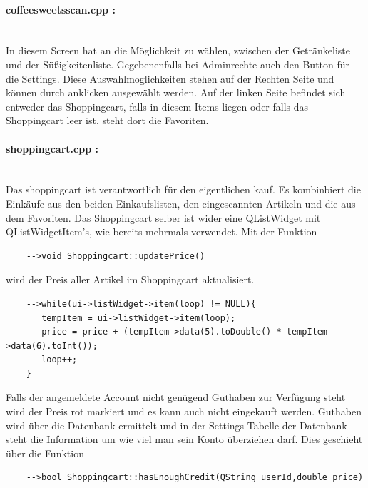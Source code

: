 \documentclass[11pt,a4paper]{article} %
\begin{document}
\paragraph{coffeesweetsscan.cpp :} $\;$ \\
	In diesem Screen hat an die Möglichkeit zu wählen, zwischen der Getränkeliste und der Süßigkeitenliste. Gegebenenfalls bei Adminrechte auch den Button für die Settings.
	Diese Auswahlmoglichkeiten stehen auf der Rechten Seite und können durch anklicken ausgewählt werden. 
	Auf der linken Seite befindet sich entweder das Shoppingcart, falls in diesem Items liegen oder falls das Shoppingcart leer ist, steht dort die Favoriten.
\par	
\paragraph{shoppingcart.cpp :} $\;$ \\
	Das shoppingcart ist verantwortlich für den eigentlichen kauf. Es kombinbiert die Einkäufe aus den beiden Einkaufslisten, den eingescannten Artikeln und die aus dem Favoriten.
	Das Shoppingcart selber ist wider eine QListWidget mit QListWidgetItem's, wie bereits mehrmals verwendet.
	Mit der Funktion 
		\begin{frame}

\begin{lstlisting}
	-->void Shoppingcart::updatePrice()
	    \end{lstlisting}
\end{frame}
	 wird der Preis aller Artikel im Shoppingcart aktualisiert. 
	\begin{frame}

\begin{lstlisting}
	-->while(ui->listWidget->item(loop) != NULL){
       tempItem = ui->listWidget->item(loop);
       price = price + (tempItem->data(5).toDouble() * tempItem->data(6).toInt());
       loop++;
    }
    \end{lstlisting}
\end{frame}
	Falls der angemeldete Account nicht genügend Guthaben zur Verfügung steht wird der Preis rot markiert und es kann auch nicht eingekauft werden.
	Guthaben wird über die Datenbank ermittelt und in der Settings-Tabelle der Datenbank steht die Information um wie viel man sein Konto überziehen darf.
	Dies geschieht über die Funktion
	 \begin{frame}

\begin{lstlisting}
	-->bool Shoppingcart::hasEnoughCredit(QString userId,double price)
		\end{lstlisting}
\end{frame}
\end{document}
